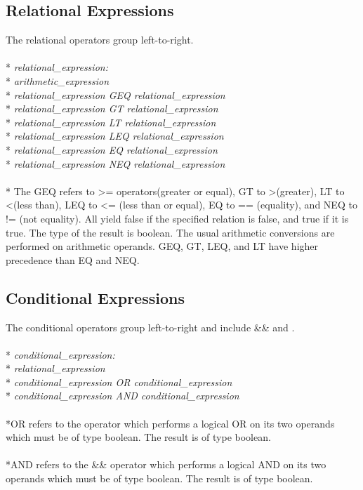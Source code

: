 \subsection{Relational Expressions}
The relational operators group left-to-right.
\\ \\* \tab \emph{relational\_expression:}
\\* \tab \tab \emph{arithmetic\_expression}
\\* \tab \tab \emph{relational\_expression GEQ relational\_expression}
\\* \tab \tab \emph{relational\_expression GT relational\_expression}
\\* \tab \tab \emph{relational\_expression LT relational\_expression}
\\* \tab \tab \emph{relational\_expression LEQ relational\_expression}
\\* \tab \tab \emph{relational\_expression EQ relational\_expression}
\\* \tab \tab \emph{relational\_expression NEQ relational\_expression}
\\ \\* The GEQ refers to \textgreater= operators(greater or equal), GT to \textgreater (greater), LT to \textless (less than), LEQ to \textless= (less than or equal), EQ to == (equality), and NEQ to != (not equality). All yield false if the specified relation is false, and true if it is true. The type of the result is boolean. The usual arithmetic conversions are performed on arithmetic operands. GEQ, GT, LEQ, and LT have higher precedence than EQ and NEQ.

\subsection{Conditional Expressions}
The conditional operators group left-to-right and include \&\& and \textbar\textbar.
\\ \\* \tab \emph{conditional\_expression:}
\\* \tab \tab \emph{relational\_expression}
\\* \tab \tab \emph{conditional\_expression OR conditional\_expression}
\\* \tab \tab \emph{conditional\_expression AND conditional\_expression}
\\ \\*OR refers to the \textbar\textbar operator which performs a logical OR on its two operands which must be of type boolean. The result is of type boolean. 
\\ \\*AND refers to the \&\& operator which performs a logical AND on its two operands which must be of type boolean. The result is of type boolean.

